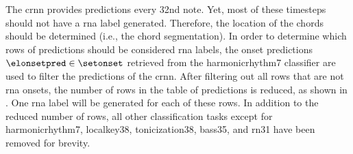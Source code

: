 
The \gls{crnn} provides predictions every \gls{32nd} note.
Yet, most of these timesteps should not have a \gls{rna}
label generated. Therefore, the location of the chords
should be determined (i.e., the chord segmentation). In
order to determine which rows of predictions should be
considered \gls{rna} labels, the onset predictions
$\elonsetpred \in \setonset$ retrieved from the
\gls{harmonicrhythm7} classifier are used to filter the
predictions of the \gls{crnn}. After filtering out all rows
that are not \gls{rna} onsets, the number of rows in the
table of predictions is reduced, as shown in
. One \gls{rna} label
will be generated for each of these rows. In addition to the
reduced number of rows, all other classification tasks
except for \gls{harmonicrhythm7}, \gls{localkey38},
\gls{tonicization38}, \gls{bass35}, and \gls{rn31} have been
removed for brevity.

